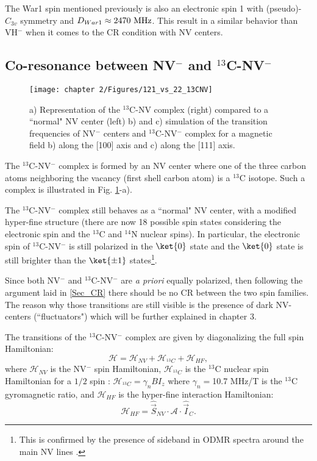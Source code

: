 \documentclass[a4paper, 11pt]{report}
\begin{document}
The War1 spin mentioned previously is also an electronic spin 1 with (pseudo)-$C_{3v}$ symmetry and $D_{War1} \approx 2470\ \rm MHz$. This result in a similar behavior than VH$^-$ when it comes to the CR condition with NV centers.

\subsection{Co-resonance between NV$^-$ and $^{13}$C-NV$^-$}
\label{sec NV-13c-NV}

\begin{figure}[h]
\centering
\texttt{[image: chapter 2/Figures/121\_vs\_22\_13CNV]}
\caption{a) Representation of the $^{13}$C-NV complex (right) compared to a ``normal" NV center (left) b) and c) simulation of the transition frequencies of NV$^-$ centers and $^{13}$C-NV$^-$ complex for a magnetic field b) along the [100] axis and c) along the [111] axis.}
\label{121 vs 22 13C-NV}
\end{figure}

The $^{13}$C-NV$^-$ complex is formed by an NV center where one of the three carbon atoms neighboring the vacancy (first shell carbon atom) is a $^{13}$C isotope. Such a complex is illustrated in Fig. \ref{121 vs 22 13C-NV}-a).

The $^{13}$C-NV$^-$ complex still behaves as a ``normal" NV center, with a modified hyper-fine structure (there are now 18 possible spin states considering the electronic spin and the $^{13}$C and $^{14}$N nuclear spins). In particular, the electronic spin of $^{13}$C-NV$^-$ is still polarized in the $\ket{0}$ state and the $\ket{0}$ state is still brighter than the $\ket{\pm 1}$ states\footnote{This is confirmed by the presence of sideband in ODMR spectra around the main NV lines \citep{simanovskaia2013sidebands}.}. 

Since both NV$^-$ and $^{13}$C-NV$^-$ are \textit{a priori} equally polarized, then following the argument laid in \ref{Sec_CR} there should be no CR between the two spin families. The reason why those transitions are still visible is the presence of dark NV-centers (``fluctuators") which will be further explained in chapter 3.

The transitions of the $^{13}$C-NV$^-$ complex are given by diagonalizing the full spin Hamiltonian:
\begin{equation*}
\mathcal{H}=\mathcal{H}_{NV}+\mathcal{H}_{^{13}C}+\mathcal{H}_{HF},
\end{equation*}
where $\mathcal{H}_{NV}$ is the NV$^-$ spin Hamiltonian,
$\mathcal{H}_{^{13}C}$ is the $^{13}$C nuclear spin Hamiltonian for a $1/2$ spin : $\mathcal{H}_{^{13}C}=\gamma_{n} B I_z$ where $\gamma_{n}=$10.7 MHz/T is the $^{13}$C gyromagnetic ratio, and $\mathcal{H}_{HF}$ is the hyper-fine interaction Hamiltonian: $$\mathcal{H}_{HF}= \hat{\vec{S}}_{NV} \cdot \mathcal{A} \cdot \hat{\vec{I}}_C.$$
\end{document}
